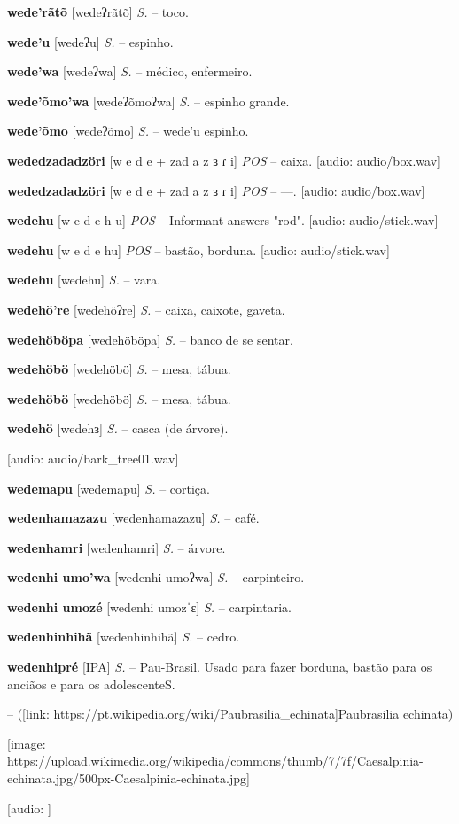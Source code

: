 {{{{{{{{{{{{{{{\textbf{wede'rãtõ} [wedeʔrãtõ] \textit{S.} -- toco.

\textbf{wede'u} [wedeʔu] \textit{S.} -- espinho.

\textbf{wede'wa} [wedeʔwa] \textit{S.} -- médico, enfermeiro.

\textbf{wede'õmo'wa} [wedeʔõmoʔwa] \textit{S.} -- espinho grande.

\textbf{wede'õmo} [wedeʔõmo] \textit{S.} -- wede'u espinho.

\textbf{wededzadadzöri} [w e d e + zad a z ɜ ɾ i] \textit{POS} -- caixa. [audio: audio/box.wav]{\faHeadphones}

\textbf{wededzadadzöri} [w e d e + zad a z ɜ ɾ i] \textit{POS} -- —. [audio: audio/box.wav]{\faHeadphones}

\textbf{wedehu} [w e d e h u] \textit{POS} -- Informant answers "rod". [audio: audio/stick.wav]{\faHeadphones}

\textbf{wedehu} [w e d e hu] \textit{POS} -- bastão, borduna. [audio: audio/stick.wav]{\faHeadphones}

\textbf{wedehu} [wedehu] \textit{S.} -- vara.

\textbf{wedehö're} [wedehöʔre] \textit{S.} -- caixa, caixote, gaveta.

\textbf{wedehöböpa} [wedehöböpa] \textit{S.} -- banco de se sentar.

\textbf{wedehöbö} [wedehöbö] \textit{S.} -- mesa, tábua.

\textbf{wedehöbö} [wedehöbö] \textit{S.} -- mesa, tábua.

\textbf{wedehö} [wedehɜ] \textit{S.} -- casca (de árvore).} [audio: audio/bark_tree01.wav]{\faHeadphones}

\textbf{wedemapu} [wedemapu] \textit{S.} -- cortiça.

\textbf{wedenhamazazu} [wedenhamazazu] \textit{S.} -- café.

\textbf{wedenhamri} [wedenhamri] \textit{S.} -- árvore.

\textbf{wedenhi umo'wa} [wedenhi umoʔwa] \textit{S.} -- carpinteiro.

\textbf{wedenhi umozé} [wedenhi umozˈɛ] \textit{S.} -- carpintaria.

\textbf{wedenhinhihã} [wedenhinhihã] \textit{S.} -- cedro.

\textbf{wedenhipré} [IPA] \textit{S.} -- Pau-Brasil. Usado para fazer borduna, bastão para os anciãos e para os adolescenteS.} -- ([link: https://pt.wikipedia.org/wiki/Paubrasilia_echinata]Paubrasilia echinata)} [image: https://upload.wikimedia.org/wikipedia/commons/thumb/7/7f/Caesalpinia-echinata.jpg/500px-Caesalpinia-echinata.jpg]} [audio: ]

}}}}}}}}}}}
